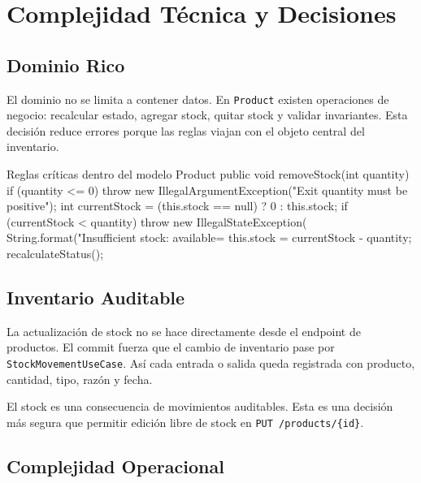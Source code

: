 \documentclass[11pt,oneside]{report}
\begin{document}
\chapter{Complejidad Técnica y Decisiones}

\section{Dominio Rico}

El dominio no se limita a contener datos. En \texttt{Product} existen operaciones de negocio: recalcular estado, agregar stock, quitar stock y validar invariantes. Esta decisión reduce errores porque las reglas viajan con el objeto central del inventario.

\begin{codewindow}[language=Java]{Reglas críticas dentro del modelo Product}
public void removeStock(int quantity) {
    if (quantity <= 0) {
        throw new IllegalArgumentException("Exit quantity must be positive");
    }
    int currentStock = (this.stock == null) ? 0 : this.stock;
    if (currentStock < quantity) {
        throw new IllegalStateException(
                String.format("Insufficient stock: available=%
    }
    this.stock = currentStock - quantity;
    recalculateStatus();
}
\end{codewindow}

\section{Inventario Auditable}

La actualización de stock no se hace directamente desde el endpoint de productos. El commit fuerza que el cambio de inventario pase por \texttt{StockMovementUseCase}. Así cada entrada o salida queda registrada con producto, cantidad, tipo, razón y fecha.

\begin{infobox}
El stock es una consecuencia de movimientos auditables. Esta es una decisión más segura que permitir edición libre de stock en \texttt{PUT /products/\{id\}}.
\end{infobox}

\section{Complejidad Operacional}
\end{document}

